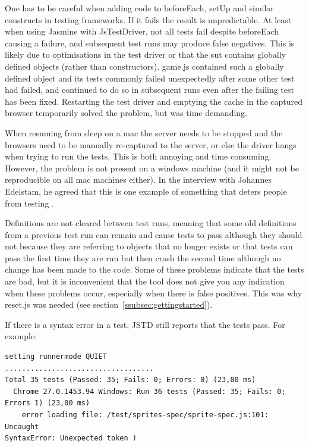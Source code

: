 \documentclass[11pt]{article}
\begin{document}
One has to be careful when adding code to beforeEach, setUp and similar constructs in testing frameworks. If it fails the result is unpredictable. At least when using Jasmine with JsTestDriver, not all tests fail despite beforeEach causing a failure, and subsequent test runs may produce false negatives. This is likely due to optimisations in the test driver or that the \gls{sut} contains globally defined objects (rather than constructors). game.js contained such a globally defined object and its tests commonly failed unexpectedly after some other test had failed, and continued to do so in subsequent runs even after the failing test has been fixed. Restarting the test driver and emptying the cache in the captured browser temporarily solved the problem, but was time demanding.

When resuming from sleep on a mac the server needs to be stopped and the browsers need to be manually re-captured to the server, or else the driver hangs when trying to run the tests. This is both annoying and time consuming. However, the problem is not present on a windows machine (and it might not be reproducible on all mac machines either). In the interview with Johannes Edelstam, he agreed that this is one example of something that deters people from testing \cite{Edelstam}.

Definitions are not cleared between test runs, meaning that some old definitions from a previous test run can remain and cause tests to pass although they should not because they are referring to objects that no longer exists or that tests can pass the first time they are run but then crash the second time although no change has been made to the code. Some of these problems indicate that the tests are bad, but it is inconvenient that the tool does not give you any indication when these problems occur, especially when there is false positives. This was why reset.js was needed (see section~\ref{ssubsec:gettingstarted}).

If there is a syntax error in a test, JSTD still reports that the tests pass. For example:

\begin{verbatim}
setting runnermode QUIET
...................................
Total 35 tests (Passed: 35; Fails: 0; Errors: 0) (23,00 ms)
  Chrome 27.0.1453.94 Windows: Run 36 tests (Passed: 35; Fails: 0;
Errors 1) (23,00 ms)
    error loading file: /test/sprites-spec/sprite-spec.js:101: Uncaught
SyntaxError: Unexpected token )
\end{verbatim}
\end{document}
